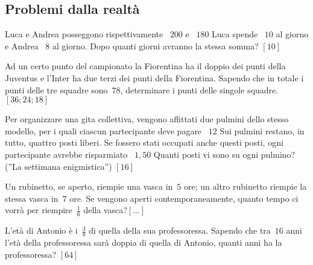 \subsection{Problemi dalla realtà}

\begin{multicols}{2}
\begin{esercizio}[\Ast]
\label{ese:14.39}
Luca e Andrea posseggono rispettivamente \officialeuro~\(200\) e 
\officialeuro~\(180\) Luca spende \officialeuro~\(10\) al giorno e Andrea 
\officialeuro~\(8\) al giorno. Dopo quanti giorni avranno la stessa somma? 
\hfill \(\left[10\right]\)
\end{esercizio}

\begin{esercizio}[\Ast]
\label{ese:14.40}
Ad un certo punto del campionato la Fiorentina ha il doppio dei punti della 
Juventus e l'Inter ha due terzi dei punti della Fiorentina. Sapendo che in 
totale i punti delle tre squadre sono~\(78\), determinare i punti delle singole 
squadre. \hfill \(\left[36; 24; 18\right]\)
\end{esercizio}

\begin{esercizio}[\Ast]
\label{ese:14.41}
Per organizzare una gita collettiva, vengono affittati due pulmini dello stesso 
modello, per i quali ciascun partecipante deve pagare \officialeuro~\(12\) Sui 
pulmini restano, in tutto, quattro posti liberi. Se fossero stati occupati anche 
questi posti, ogni partecipante avrebbe risparmiato \officialeuro~\(1,50\) Quanti 
posti vi sono su ogni pulmino? (''La settimana enigmistica'') 
\hfill \(\left[16\right]\)
\end{esercizio}

\begin{esercizio}
\label{ese:14.42}
Un rubinetto, se aperto, riempie una vasca in~\(5\) ore; un altro rubinetto 
riempie la stessa vasca in~\(7\) ore. Se vengono aperti contemporaneamente, quanto 
tempo ci vorrà per riempire~\(\frac{1}{6}\) della vasca?\hfill \(\left[...\right]\)
\end{esercizio}

\begin{esercizio}[\Ast]
\label{ese:14.43}
L'età di Antonio è i~\(\frac{3}{8}\) di quella della sua professoressa. Sapendo 
che tra~\(16\) anni l'età della professoressa sarà doppia di quella di Antonio, 
quanti anni ha la professoressa? \hfill \(\left[64\right]\)
\end{esercizio}


\end{multicols}
